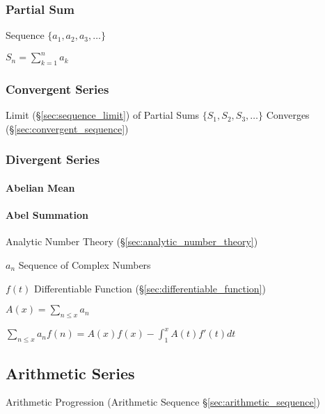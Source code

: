 \subsubsection{Partial Sum}\label{sec:partial_sum}

Sequence $\{ a_1, a_2, a_3, \ldots \}$

$S_n = \sum_{k=1}^n a_k$



\subsubsection{Convergent Series}\label{sec:convergent_series}

Limit (\S\ref{sec:sequence_limit}) of Partial Sums $\{ S_1, S_2, S_3,
\ldots \}$ Converges (\S\ref{sec:convergent_sequence})



\subsubsection{Divergent Series}\label{sec:divergent_series}

\paragraph{Abelian Mean}\label{sec:abelian_mean}\hfill

\paragraph{Abel Summation}\label{sec:abel_summation}\hfill

Analytic Number Theory (\S\ref{sec:analytic_number_theory})

$a_n$ Sequence of Complex Numbers

$f(t)$ Differentiable Function (\S\ref{sec:differentiable_function})

$A(x) = \sum_{n \leq x} a_n$

$\sum_{n \leq x} a_n f(n) = A(x)f(x) - \int_1^x A(t)f'(t) dt$



\subsection{Arithmetic Series}\label{sec:arithmetic_series}

Arithmetic Progression (Arithmetic Sequence
\S\ref{sec:arithmetic_sequence})



